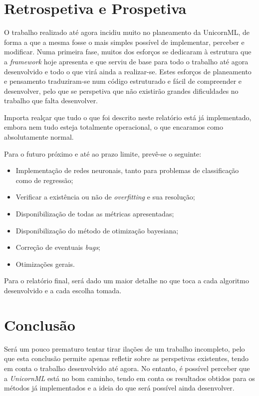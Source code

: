 \documentclass[a4paper]{report}
\begin{document}
\chapter{Retrospetiva e Prospetiva} \label{ch:FutureWork}
\large{
	O trabalho realizado até agora incidiu muito no planeamento da UnicornML, de forma a que a mesma fosse o mais simples possível de implementar, perceber e modificar.
	Numa primeira fase, muitos dos esforços se dedicaram à estrutura que a \textit{framework} hoje apresenta e que serviu de base para todo o trabalho até agora desenvolvido e todo o que virá ainda a realizar-se.
	Estes esforços de planeamento e pensamento traduziram-se num código estruturado e fácil de compreender e desenvolver, pelo que se perspetiva que não existirão grandes dificuldades no trabalho que falta desenvolver.

	Importa realçar que tudo o que foi descrito neste relatório está já implementado, embora nem tudo esteja totalmente operacional, o que encaramos como absolutamente normal.

	Para o futuro próximo e até ao prazo limite, prevê-se o seguinte:
	\begin{itemize}
		\item Implementação de redes neuronais, tanto para  problemas de classificação como de regressão;
		\item Verificar a existência ou não de \textit{overfitting} e sua resolução;
		\item Disponibilização de todas as métricas apresentadas;
		\item Disponibilização do método de otimização bayesiana;
		\item Correção de eventuais \textit{bugs};
		\item Otimizações gerais.
	\end{itemize}

	Para o relatório final, será dado um maior detalhe no que toca a cada algoritmo desenvolvido e a cada escolha tomada.
}

\chapter{Conclusão} \label{ch:Conclusion}
\large{
	Será um pouco prematuro tentar tirar ilações de um trabalho incompleto, pelo que esta conclusão permite apenas refletir sobre as perspetivas existentes, tendo em conta o trabalho desenvolvido até agora.
	No entanto, é possível perceber que a \textsl{UnicornML} está no bom caminho, tendo em conta os resultados obtidos para os métodos já implementados e a ideia do que será possível ainda desenvolver.
}
\end{document}
